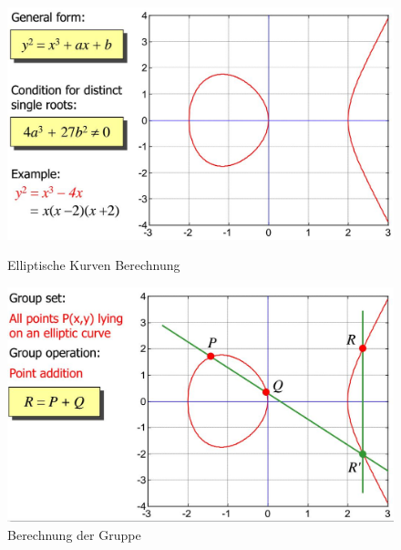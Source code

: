 \begin{figure}[ht!]
	\centering
	\begin{minipage}[t]{0.4\textwidth}
		\centering
		\includegraphics[width=\linewidth]{images/eliptic_curve_calculation}
		\caption{Elliptische Kurven Berechnung}
		\label{fig:elipticcurvecalculation}
	\end{minipage}
	\begin{minipage}[t]{0.4\textwidth}
		\centering
		\includegraphics[width=\linewidth]{images/eliptic_curve_calculation2}
		\caption{Berechnung der Gruppe}
		\label{fig:elipticcurvecalculation2}
	\end{minipage}
\end{figure}

